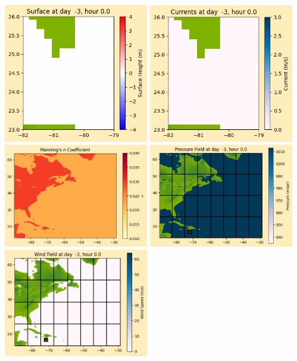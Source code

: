 \documentclass[11pt]{article}
\begin{document}
\vskip 10pt 
\includegraphics[width=0.475\textwidth]{frame0000fig1009.png}
\includegraphics[width=0.475\textwidth]{frame0000fig1010.png}
\vskip 10pt 
\includegraphics[width=0.475\textwidth]{frame0000fig1011.png}
\includegraphics[width=0.475\textwidth]{frame0000fig1012.png}
\vskip 10pt 
\includegraphics[width=0.475\textwidth]{frame0000fig1013.png}
\end{document}

